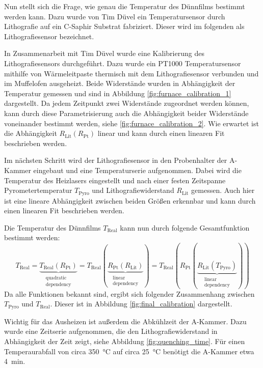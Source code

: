 Nun stellt sich die Frage, wie genau die Temperatur des Dünnfilms bestimmt werden kann.
Dazu wurde von Tim Düvel ein Temperatursensor durch Lithografie auf ein C-Saphir Substrat fabriziert.
Dieser wird im folgenden als Lithografiesensor bezeichnet.

In Zusammenarbeit mit Tim Düvel wurde eine Kalibrierung des Lithografiesensors durchgeführt.
Dazu wurde ein PT1000 Temperatursensor mithilfe von Wärmeleitpaste thermisch mit dem Lithografiesensor verbunden und
im Muffelofen ausgeheizt.
Beide Widerstände wurden in Abhängigkeit der Temperatur gemessen und sind in Abbildung \ref{fig:furnace_calibration_1}
dargestellt.
Da jedem Zeitpunkt zwei Widerstände zugeordnet werden können, kann durch diese Parametrisierung auch die Abhängigkeit
beider Widerstände voneinander bestimmt werden, siehe \ref{fig:furnace_calibration_2}.
Wie erwartet ist die Abhängigkeit $R_\mathrm{Lit}(R_\mathrm{Pt})$ linear und kann durch
einen linearen Fit beschrieben werden.

Im nächsten Schritt wird der Lithografiesensor in den Probenhalter der A-Kammer eingebaut und eine Temperaturserie
aufgenommen.
Dabei wird die Temperatur des Heizlasers eingestellt und nach einer festen Zeitspanne Pyrometertemperatur
$T_\mathrm{Pyro}$ und Lithografiewiderstand $R_\mathrm{Lit}$ gemessen.
Auch hier ist eine lineare Abhängigkeit zwischen beiden Größen erkennbar und kann durch einen linearen Fit
beschrieben werden.

Die Temperatur des Dünnfilms $T_\mathrm{Real}$ kann nun durch folgende Gesamtfunktion bestimmt werden:
\begin{equation}
    T_{\mathrm{Real}}=\underbrace{ T_{\mathrm{Real}}(R_{\mathrm{Pt}}) }_{ \substack{\text{quadratic} \\ \text{dependency}} }
    =T_{\mathrm{Real}}(\underbrace{ R_{\mathrm{Pt}}(R_{\mathrm{Lit}}) }_{  \substack{\text{linear} \\ \text{dependency}}  })
    =T_{\mathrm{Real}}(R_{\mathrm{Pt}}(\underbrace{ R_{\mathrm{Lit}}(T_{\mathrm{Pyro}}) }_{    \substack{\text{linear} \\
    \text{dependency}}  }))
    \label{eq:temperature_calibration}
\end{equation}
Da alle Funktionen bekannt sind, ergibt sich folgender Zusammenhang zwischen $T_{\mathrm{Pyro}}$ und $T_{\mathrm{Real}}$.
Dieser ist in Abbildung \ref{fig:final_calibration} dargestellt.

Wichtig für das Ausheizen ist außerdem die Abkühlzeit der A-Kammer.
Dazu wurde eine Zeitserie aufgenommen, die den Lithografiewiderstand in Abhängigkeit der Zeit zeigt, siehe
Abbildung \ref{fig:quenching_time}.
Für einen Temperaurabfall von circa \qty{350}{\degreeCelsius} auf circa \qty{25}{\degreeCelsius}
benötigt die A-Kammer etwa \qty{4}{\minute}.



